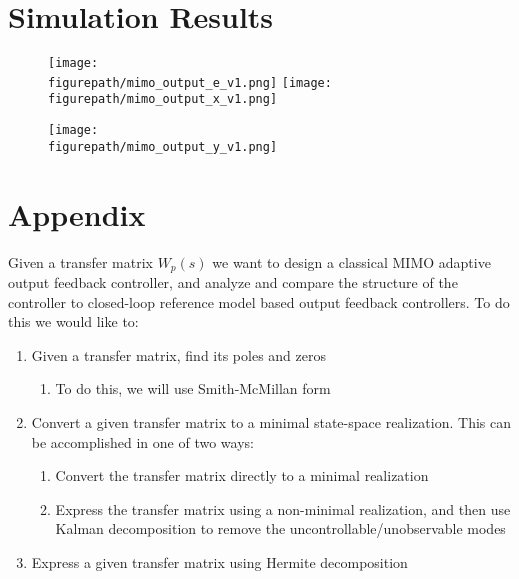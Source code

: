\section{Simulation Results}

\begin{figure}[H]
  \begin{center}
    \texttt{[image: \\figurepath/mimo\_output\_e\_v1.png]}
    \texttt{[image: \\figurepath/mimo\_output\_x\_v1.png]}
  \end{center}
\end{figure}

\begin{figure}[H]
  \begin{center}
    \texttt{[image: \\figurepath/mimo\_output\_y\_v1.png]}
  \end{center}
\end{figure}

\section{Appendix}

Given a transfer matrix $W_{p}(s)$ we want to design a classical MIMO adaptive output feedback controller, and analyze and compare the structure of the controller to closed-loop reference model based output feedback controllers.
To do this we would like to:

\begin{enumerate}
  \item{Given a transfer matrix, find its poles and zeros}
  \begin{enumerate}
    \item{To do this, we will use Smith-McMillan form}
  \end{enumerate}
  \item{%
    Convert a given transfer matrix to a minimal state-space realization.
    This can be accomplished in one of two ways:
  }
  \begin{enumerate}
  \item{Convert the transfer matrix directly to a minimal realization}
  \item{Express the transfer matrix using a non-minimal realization, and then use Kalman decomposition to remove the uncontrollable/unobservable modes}
  \end{enumerate}
  \item{Express a given transfer matrix using Hermite decomposition}
\end{enumerate}

